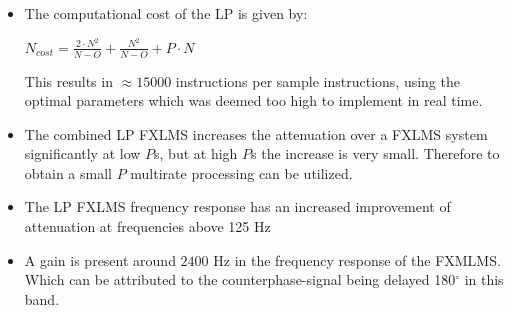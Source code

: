 \large
\begin{itemize}
\item The computational cost of the LP is given by:
\vspace{-2mm}
\begin{center}
{\large
$N_{cost}=\frac{2 \cdot N^2}{N-O}+\frac{N^2}{N-O}+P \cdot N$
}
\end{center}

	  This results in $\approx15000$ instructions per sample instructions, using the optimal parameters which was deemed too high to implement in real time. \\
\item The combined LP FXLMS increases the attenuation over a FXLMS system significantly at low $P$s, but at high $P$s the increase is very small. 
	  Therefore to obtain a small $P$ multirate processing can be utilized. \\ 
\item The LP FXLMS frequency response has an increased improvement of attenuation at frequencies above 125 Hz \\
\item A gain is present around $2400$ Hz in the frequency response of the FXMLMS. Which can be attributed to the counterphase-signal being delayed 180$^{\circ}$ in this band.

\end{itemize}

